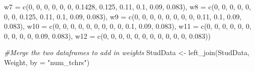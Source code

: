 \documentclass[
]{book}
\newenvironment{Shaded}{\begin{snugshade}}{\end{snugshade}}
\newcommand{\AttributeTok}[1]{\textcolor[rgb]{0.77,0.63,0.00}{#1}}
\newcommand{\CommentTok}[1]{\textcolor[rgb]{0.56,0.35,0.01}{\textit{#1}}}
\newcommand{\DecValTok}[1]{\textcolor[rgb]{0.00,0.00,0.81}{#1}}
\newcommand{\FloatTok}[1]{\textcolor[rgb]{0.00,0.00,0.81}{#1}}
\newcommand{\FunctionTok}[1]{\textcolor[rgb]{0.00,0.00,0.00}{#1}}
\newcommand{\NormalTok}[1]{#1}
\newcommand{\OtherTok}[1]{\textcolor[rgb]{0.56,0.35,0.01}{#1}}
\newcommand{\StringTok}[1]{\textcolor[rgb]{0.31,0.60,0.02}{#1}}
\begin{document}
\begin{Shaded}
\begin{Highlighting}[]
                     \AttributeTok{w7 =} \FunctionTok{c}\NormalTok{(}\DecValTok{0}\NormalTok{, }\DecValTok{0}\NormalTok{, }\DecValTok{0}\NormalTok{, }\DecValTok{0}\NormalTok{, }\DecValTok{0}\NormalTok{, }\DecValTok{0}\NormalTok{, }\FloatTok{0.1428}\NormalTok{, }\FloatTok{0.125}\NormalTok{, }\FloatTok{0.11}\NormalTok{, }\FloatTok{0.1}\NormalTok{, }\FloatTok{0.09}\NormalTok{, }\FloatTok{0.083}\NormalTok{),}
                     \AttributeTok{w8 =} \FunctionTok{c}\NormalTok{(}\DecValTok{0}\NormalTok{, }\DecValTok{0}\NormalTok{, }\DecValTok{0}\NormalTok{, }\DecValTok{0}\NormalTok{, }\DecValTok{0}\NormalTok{, }\DecValTok{0}\NormalTok{, }\DecValTok{0}\NormalTok{, }\FloatTok{0.125}\NormalTok{, }\FloatTok{0.11}\NormalTok{, }\FloatTok{0.1}\NormalTok{, }\FloatTok{0.09}\NormalTok{, }\FloatTok{0.083}\NormalTok{),}
                     \AttributeTok{w9 =} \FunctionTok{c}\NormalTok{(}\DecValTok{0}\NormalTok{, }\DecValTok{0}\NormalTok{, }\DecValTok{0}\NormalTok{, }\DecValTok{0}\NormalTok{, }\DecValTok{0}\NormalTok{, }\DecValTok{0}\NormalTok{, }\DecValTok{0}\NormalTok{, }\DecValTok{0}\NormalTok{, }\FloatTok{0.11}\NormalTok{, }\FloatTok{0.1}\NormalTok{, }\FloatTok{0.09}\NormalTok{, }\FloatTok{0.083}\NormalTok{),}
                     \AttributeTok{w10 =} \FunctionTok{c}\NormalTok{(}\DecValTok{0}\NormalTok{, }\DecValTok{0}\NormalTok{, }\DecValTok{0}\NormalTok{, }\DecValTok{0}\NormalTok{, }\DecValTok{0}\NormalTok{, }\DecValTok{0}\NormalTok{, }\DecValTok{0}\NormalTok{, }\DecValTok{0}\NormalTok{, }\DecValTok{0}\NormalTok{, }\FloatTok{0.1}\NormalTok{, }\FloatTok{0.09}\NormalTok{, }\FloatTok{0.083}\NormalTok{),}
                     \AttributeTok{w11 =} \FunctionTok{c}\NormalTok{(}\DecValTok{0}\NormalTok{, }\DecValTok{0}\NormalTok{, }\DecValTok{0}\NormalTok{, }\DecValTok{0}\NormalTok{, }\DecValTok{0}\NormalTok{, }\DecValTok{0}\NormalTok{, }\DecValTok{0}\NormalTok{, }\DecValTok{0}\NormalTok{, }\DecValTok{0}\NormalTok{, }\DecValTok{0}\NormalTok{, }\FloatTok{0.09}\NormalTok{, }\FloatTok{0.083}\NormalTok{),}
                     \AttributeTok{w12 =} \FunctionTok{c}\NormalTok{(}\DecValTok{0}\NormalTok{, }\DecValTok{0}\NormalTok{, }\DecValTok{0}\NormalTok{, }\DecValTok{0}\NormalTok{, }\DecValTok{0}\NormalTok{, }\DecValTok{0}\NormalTok{, }\DecValTok{0}\NormalTok{, }\DecValTok{0}\NormalTok{, }\DecValTok{0}\NormalTok{, }\DecValTok{0}\NormalTok{, }\DecValTok{0}\NormalTok{, }\FloatTok{0.083}\NormalTok{))}

\CommentTok{\#Merge the two dataframes to add in weights}
\NormalTok{StudData }\OtherTok{\textless{}{-}} \FunctionTok{left\_join}\NormalTok{(StudData, Weight, }\AttributeTok{by =} \StringTok{"num\_tchrs"}\NormalTok{)}


\end{Highlighting}
\end{Shaded}
\end{document}
